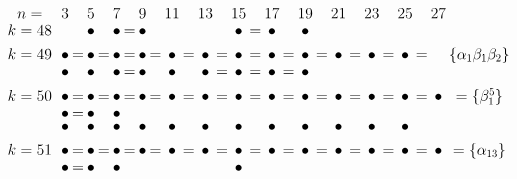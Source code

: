 \documentclass{article}
\begin{document}
\(
\begin{tikzcd}[
nodes={font=\Large,inner sep=0pt},
row sep=0.2cm,
column sep=0.1cm
]
n= && & 3 & & 5 & & 7 & & 9 & & 11 & & 13 & & 15 & & 17 && 19 && 21 && 23 && 25 && 27\\
k=48 &&& && \bullet && \bullet &=& \bullet && && && \bullet &=& \bullet && \bullet  \\ \\
k=49 &&& \bullet &=& \bullet &=& \bullet &=& \bullet &=& \bullet &=& \bullet &=& \bullet  &=& \bullet  &=& \bullet  &=& \bullet &=& \bullet  &=& \bullet  &=& & \{\alpha_1\beta_1\beta_2\} \\
& && \bullet && \bullet && \bullet &=& \bullet && \bullet && \bullet &=& \bullet &=& \bullet &=& \bullet &&  \\ \\
k=50 &&& \bullet &=& \bullet &=& \bullet &=& \bullet &=& \bullet  &=& \bullet  &=& \bullet  &=& \bullet &=& \bullet  &=& \bullet  &=& \bullet &=& \bullet &=& \bullet & = \{\beta_1^5\} \\
& && \bullet &=& \bullet && \bullet && \\
& && \bullet && \bullet && \bullet && \bullet && \bullet && \bullet && \bullet && \bullet && \bullet && \bullet && \bullet && \bullet &&  \\ \\
k=51 &&& \bullet &=& \bullet &=& \bullet &=& \bullet &=& \bullet &=& \bullet  &=& \bullet  &=& \bullet  &=& \bullet &=& \bullet  &=& \bullet  &=& \bullet &=& \bullet & =\{\alpha_{13}\} \\
&&& \bullet &=& \bullet && \bullet && && && && \bullet \\
\\
\end{tikzcd}
\)
\end{document}
